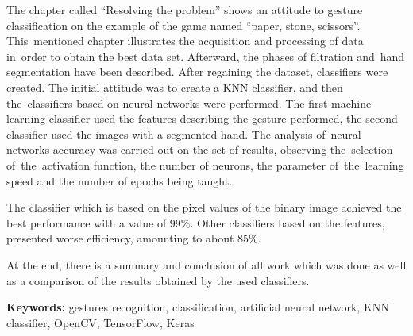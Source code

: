 The chapter called “Resolving the problem” shows an attitude to gesture classification on the example of the game named “paper, stone, scissors”. This~mentioned chapter illustrates the acquisition and processing of data in~order to obtain the best data set.  Afterward, the phases of filtration and~hand segmentation have been described. After regaining the dataset, classifiers were created. The initial attitude was to create a KNN classifier, and then the~classifiers based on neural networks were performed. The first machine learning classifier used the features describing the gesture performed, the second classifier used the images with a segmented hand. The analysis of~neural networks accuracy was carried out on the set of results, observing the~selection of~the~activation function, the number of neurons, the parameter of~the~learning speed and the number of epochs being taught.  

The classifier which is based on the pixel values of the binary image achieved the best performance with a value of 99\%. Other classifiers based on the features, presented worse efficiency, amounting to about 85\%.

At the end, there is a summary and conclusion of all work which was done as well as a comparison of the results obtained by the used classifiers.

\bigskip
{\noindent\bf Keywords:} gestures recognition, classification, artificial neural network, KNN classifier, OpenCV, TensorFlow, Keras

\vfill